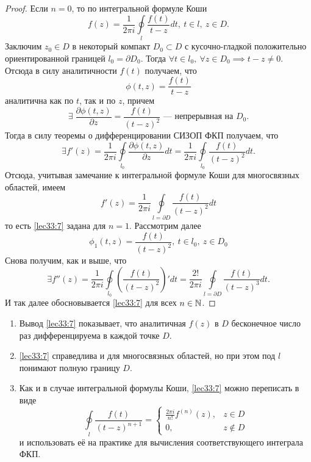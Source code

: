 \documentclass[../../main.tex]{subfiles}
\begin{document}
\begin{proof}
	Если $n=0$, то по интегральной формуле Коши
	\[
	f(z) = \frac{1}{2\pi i} \oint \limits_l
	\frac{f(t)}{t-z} dt,\ t \in l,\ z \in D.
	\]
	Заключим $z_0 \in D$ в некоторый компакт $D_0 \subset D$ с
	кусочно-гладкой положительно ориентированной границей
	$l_0 = \partial D_0$. Тогда
	$
	\forall t \in l_0,\ 
	\forall z \in D_0
	\implies t - z \neq 0.$
	Отсюда в силу аналитичности $f(t)$ получаем, что
	\begin{equation}
	\label{lec33:9}
	\phi(t, z) = \frac{f(t)}{t-z} 
	\end{equation}
	аналитична как по $t$, так и по $z$, причем
	\[
	\exists\; \frac{\partial \phi(t, z)}{\partial z}
	= \frac{f(t)}{(t-z)^2}
	\text{~--- непрерывная на } D_0.
	\]
	Тогда в силу теоремы о дифференцировании СИЗОП ФКП
	получаем, что 
	\begin{equation}
	\label{lec33:10}
	\exists f'(z) = \frac{1}{2\pi i} \oint\limits_{l_0}
	\frac{\partial \phi(t, z)}{\partial z} dt = 
	\frac{1}{2\pi i} \oint\limits_{l_0}\frac{f(t)}{(t-z)^2} 
	dt.
	\end{equation}
	Отсюда, учитывая замечание к интегральной формуле Коши 
	для многосвязных областей, имеем 
	\[
	f'(z) = \frac{1}{2\pi i} \oint\limits_{l = \partial D} \frac{f(t)}{(t-z)^2} 
	dt
	\]
	то есть \eqref{lec33:7} задана для $n = 1$.
	Рассмотрим далее 
	\[
	\phi_1(t, z) = \frac{f(t)}{(t-z)^2},\ t \in l_0, \
	z \in D_0
	\]
	Снова получим, как и выше, что 
	\[
	\exists f''(z) = \frac{1}{2\pi i} \oint\limits_{l_0}
	\left( \frac{f(t)}{(t-z)^2} \right)' dt =
	\frac{2!}{2\pi i} \oint\limits_{l = \partial D}
	\frac{f(t)}{(t-z)^3} dt.
	\]
	И так далее обосновывается \eqref{lec33:7} для всех $n \in \mathbb{N}$.
\end{proof}
\begin{rems}

\;

\begin{enumerate}
	\item Вывод \eqref{lec33:7} показывает, что аналитичная $f(z)$ в 
	$D$ бесконечное число раз дифференцируема в каждой точке
	$D$.
	\item \eqref{lec33:7} справедлива и для многосвязных
	областей, но при этом под $l$ понимают полную границу $D$.
	
	\item Как и в случае интегральной формулы Коши, 
	\eqref{lec33:7} можно переписать в виде 
	\[
	\oint\limits_l \frac{f(t)}{(t-z)^{n+1}} = 
	\begin{cases}
	\frac{2\pi i}{n!} f^{(n)}(z),& z \in D \\
	0,& z \notin D
	\end{cases}
	\]
	и использовать её на практике для вычисления
	соответствующего интеграла ФКП.
\end{enumerate}

\end{rems}
\end{document}
